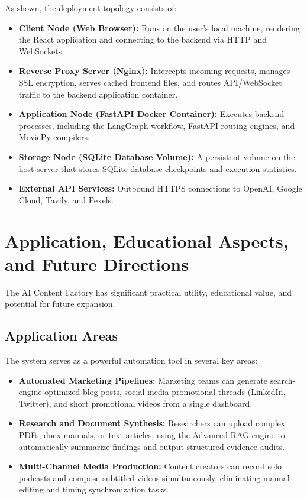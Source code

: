 As shown, the deployment topology consists of:
\begin{itemize}
    \item \textbf{Client Node (Web Browser):} Runs on the user's local machine, rendering the React application and connecting to the backend via HTTP and WebSockets.
    \item \textbf{Reverse Proxy Server (Nginx):} Intercepts incoming requests, manages SSL encryption, serves cached frontend files, and routes API/WebSocket traffic to the backend application container.
    \item \textbf{Application Node (FastAPI Docker Container):} Executes backend processes, including the LangGraph workflow, FastAPI routing engines, and MoviePy compilers.
    \item \textbf{Storage Node (SQLite Database Volume):} A persistent volume on the host server that stores SQLite database checkpoints and execution statistics.
    \item \textbf{External API Services:} Outbound HTTPS connections to OpenAI, Google Cloud, Tavily, and Pexels.
\end{itemize}

\section{Application, Educational Aspects, and Future Directions}

The AI Content Factory has significant practical utility, educational value, and potential for future expansion.

\subsection{Application Areas}
The system serves as a powerful automation tool in several key areas:
\begin{itemize}
    \item \textbf{Automated Marketing Pipelines:} Marketing teams can generate search-engine-optimized blog posts, social media promotional threads (LinkedIn, Twitter), and short promotional videos from a single dashboard.
    \item \textbf{Research and Document Synthesis:} Researchers can upload complex PDFs, docx manuals, or text articles, using the Advanced RAG engine to automatically summarize findings and output structured evidence audits.
    \item \textbf{Multi-Channel Media Production:} Content creators can record solo podcasts and compose subtitled videos simultaneously, eliminating manual editing and timing synchronization tasks.
\end{itemize}

